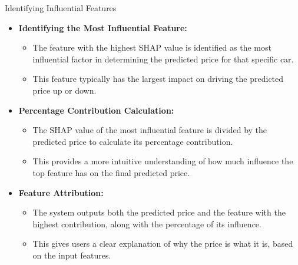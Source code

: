 \documentclass{beamer}
\begin{document}
\begin{frame}{Identifying Influential Features}
    \begin{itemize}
        \item \textbf{Identifying the Most Influential Feature:}
        \begin{itemize}
            \item The feature with the highest SHAP value is identified as the most influential factor in determining the predicted price for that specific car.
            \item This feature typically has the largest impact on driving the predicted price up or down.
        \end{itemize}
        \vspace{5pt}
        
        \item \textbf{Percentage Contribution Calculation:}
        \begin{itemize}
            \item The SHAP value of the most influential feature is divided by the predicted price to calculate its percentage contribution.
            \item This provides a more intuitive understanding of how much influence the top feature has on the final predicted price.
        \end{itemize}
        \vspace{5pt}
        
        \item \textbf{Feature Attribution:}
        \begin{itemize}
            \item The system outputs both the predicted price and the feature with the highest contribution, along with the percentage of its influence.
            \item This gives users a clear explanation of why the price is what it is, based on the input features.
        \end{itemize}
    \end{itemize}
\end{frame}
\end{document}
